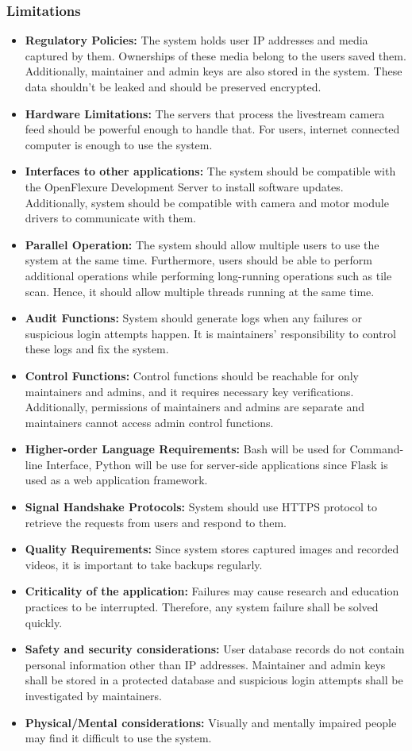 \subsubsection{Limitations}
\begin{itemize}
	\item \textbf{Regulatory Policies:} The system holds user IP addresses and media captured by them. Ownerships of these media belong to the users saved them. Additionally, maintainer and admin keys are also stored in the system. These data shouldn't be leaked and should be preserved encrypted.
	\item \textbf{Hardware Limitations:} The servers that process the livestream camera feed should be powerful enough to handle that. For users, internet connected computer is enough to use the system.
	\item \textbf{Interfaces to other applications:} The system should be  compatible with the OpenFlexure Development Server to install software updates. Additionally, system should be compatible with camera and motor module drivers to communicate with them.
	\item \textbf{Parallel Operation:} The system should allow multiple users to use the system at the same time. Furthermore, users should be able to perform additional operations while performing long-running operations such as tile scan. Hence, it should allow multiple threads running at the same time.
	\item \textbf{Audit Functions:} System should generate logs when any failures or suspicious login attempts happen. It is maintainers' responsibility to control these logs and fix the system.
	\item \textbf{Control Functions:} Control functions should be reachable for only maintainers and admins, and it requires necessary key verifications. Additionally, permissions of maintainers and admins are separate and maintainers cannot access admin control functions.
	\item \textbf{Higher-order  Language  Requirements:} Bash will be used for Command-line Interface, Python will be use for server-side applications since Flask is used as a web application framework.
	\item \textbf{Signal Handshake Protocols:} System should use HTTPS protocol to retrieve the requests from users and respond to them.
	\item \textbf{Quality Requirements:} Since system stores captured images and recorded videos, it is important to take backups regularly.
	\item \textbf{Criticality of the application:} Failures may cause research and education practices to be interrupted. Therefore, any system failure shall be solved quickly.
	\item \textbf{Safety and security considerations:} User database records do not contain personal information other than IP addresses. Maintainer and admin keys shall be stored in a protected database and suspicious login attempts shall be investigated by maintainers.
	\item \textbf{Physical/Mental  considerations:}	Visually and mentally impaired people may find it difficult to use the system.
\end{itemize}
